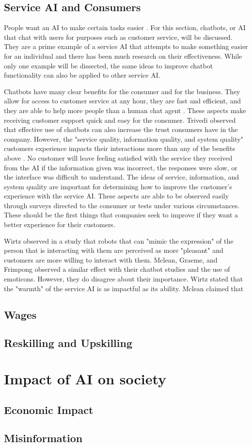 \documentclass[12pt, man]{apa6}
\begin{document}
\subsection*{Service AI and Consumers}
People want an AI to make certain tasks easier \parencite{Trivedi201991}.  For this section, chatbots, or AI that chat with users for purposes such as customer service, will be discussed.  They are a prime example of a service AI that attempts to make something easier for an individual and there has been much research on their effectiveness.  While only one example will be dissected, the same ideas to improve chatbot functionality can also be applied to other service AI.

Chatbots have many clear benefits for the consumer and for the business.  They allow for access to customer service at any hour, they are fast and efficient, and they are able to help more people than a human chat agent \parencite{McLean2017494}. These aspects make receiving customer support quick and easy for the consumer.  Trivedi \parencite*{Trivedi201991} observed that effective use of chatbots can also increase the trust consumers have in the company.  However, the "service quality, information quality, and system quality" customers experience impacts their interactions more than any of the benefits above \parencite{McLean2017494}.  No customer will leave feeling satisfied with the service they received from the AI if the information given was incorrect, the responses were slow, or the interface was difficult to understand.  The ideas of service, information, and system quality are important for determining how to improve the customer's experience with the service AI.  These aspects are able to be observed easily through surveys directed to the consumer or tests under various circumstances.  These should be the first things that companies seek to improve if they want a better experience for their customers.

Wirtz \parencite*{Wirtz2018} observed in a study that robots that can "mimic the expression" of the person that is interacting with them are perceived as more "pleasant" and customers are more willing to interact with them.  Mclean, Graeme, and Frimpong \parencite*{McLean2017494} observed a similar effect with their chatbot studies and the use of emoticons.  However, they do disagree about their importance.  Wirtz stated that the "warmth" of the service AI is as impactful as its ability.  Mclean claimed that 
\subsection*{Wages}
\subsection*{Reskilling and Upskilling}

\section*{Impact of AI on society}
\subsection*{Economic Impact}

\subsection*{Misinformation}

\printbibliography
\end{document}
